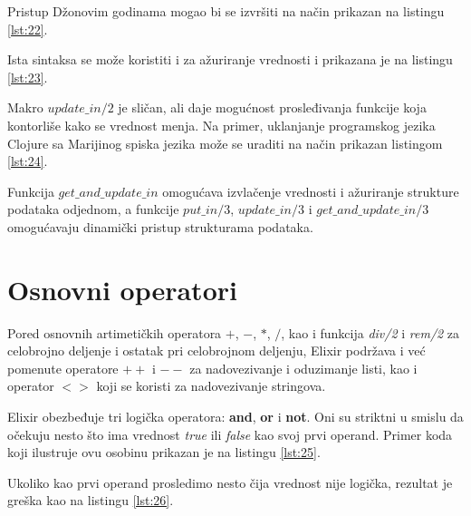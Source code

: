 \documentclass[12pt,oneside]{memoir}
\begin{document}




\noindent Pristup Džonovim godinama mogao bi se izvršiti na način prikazan na listingu \ref{lst:22}.



\noindent Ista sintaksa se može koristiti i za ažuriranje vrednosti i prikazana je na listingu \ref{lst:23}.



Makro $update\_in/2$ je sličan, ali daje mogućnost prosleđivanja funkcije koja kontorliše kako se vrednost menja. Na primer, uklanjanje programskog jezika Clojure sa Marijinog spiska jezika može se uraditi na način prikazan listingom \ref{lst:24}.



Funkcija $get\_and\_update\_in$ omogućava izvlačenje vrednosti i ažuriranje strukture podataka odjednom, a funkcije $put\_in/3$, $update\_in/3$ i $get\_and\_update\_in/3$ omogućavaju dinamički pristup strukturama podataka.



\section{Osnovni operatori}

Pored osnovnih artimetičkih operatora $+$, $-$, $*$, $/$, kao i funkcija \textit{div/2} i \textit{rem/2} za celobrojno deljenje i ostatak pri celobrojnom deljenju, Elixir podržava i već pomenute operatore $++$ i $--$ za nadovezivanje i oduzimanje listi, kao i operator $<>$ koji se koristi za nadovezivanje stringova.

Elixir obezbeđuje tri logička operatora: \textbf{and}, \textbf{or} i \textbf{not}. Oni su striktni u smislu da očekuju nesto što ima vrednost \textit{true} ili \textit{false} kao svoj prvi operand. Primer koda koji ilustruje ovu osobinu prikazan je na listingu \ref{lst:25}.



\noindent Ukoliko kao prvi operand prosledimo nesto čija vrednost nije logička, rezultat je greška kao na listingu \ref{lst:26}.
\end{document}

